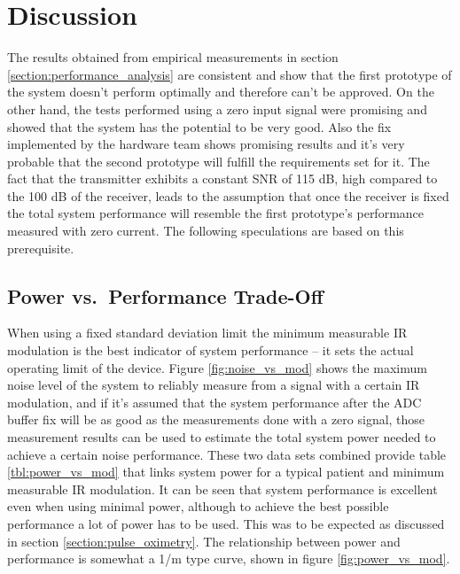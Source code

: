 \clearpage
\section{Discussion}

The results obtained from empirical measurements in section \ref{section:performance_analysis} are consistent and show that the first prototype of the system doesn't perform optimally and therefore can't be approved. On the other hand, the tests performed using a zero input signal were promising and showed that the system has the potential to be very good. Also the fix implemented by the hardware team shows promising results and it's very probable that the second prototype will fulfill the requirements set for it. The fact that the transmitter exhibits a constant SNR of 115 dB, high compared to the 100 dB of the receiver, leads to the assumption that once the receiver is fixed the total system performance will resemble the first prototype's performance measured with zero current. The following speculations are based on this prerequisite.

\subsection{Power vs.\ Performance Trade-Off}

When using a fixed \spo standard deviation limit the minimum measurable IR modulation is the best indicator of system performance -- it sets the actual operating limit of the device. Figure \ref{fig:noise_vs_mod} shows the maximum noise level of the system to reliably measure \spo from a signal with a certain IR modulation, and if it's assumed that the system performance after the ADC buffer fix will be as good as the measurements done with a zero signal, those measurement results can be used to estimate the total system power needed to achieve a certain noise performance. These two data sets combined provide table \ref{tbl:power_vs_mod} that links system power for a typical patient and minimum measurable IR modulation. It can be seen that system performance is excellent even when using minimal power, although to achieve the best possible performance a lot of power has to be used. This was to be expected as discussed in section \ref{section:pulse_oximetry}. The relationship between power and performance is somewhat a 1/m type curve, shown in figure \ref{fig:power_vs_mod}.

